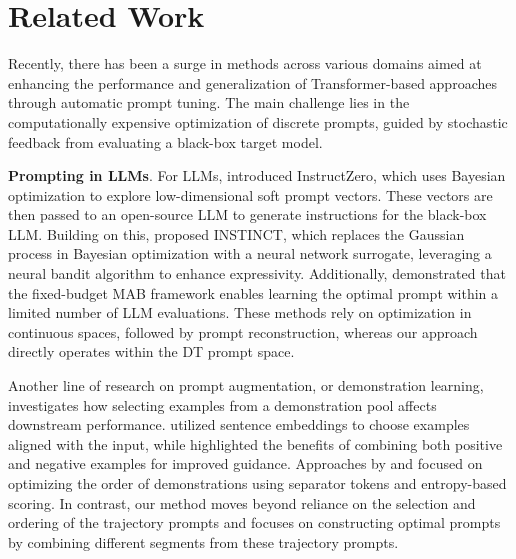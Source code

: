 \documentclass{article} %
\begin{document}

\section{Related Work}
\label{sec:related_work}
Recently, there has been a surge in methods across various domains aimed at enhancing the performance and generalization of Transformer-based approaches through automatic prompt tuning. The main challenge lies in the computationally expensive optimization of discrete prompts, guided by stochastic feedback from evaluating a black-box target model.

\textbf{Prompting in LLMs}. For LLMs, \citet{pmlr-v235-chen24e} introduced {I}nstruct{Z}ero, which uses Bayesian optimization to explore low-dimensional soft prompt vectors. These vectors are then passed to an open-source LLM to generate instructions for the black-box LLM. Building on this, \citet{lin2023use} proposed INSTINCT, which replaces the Gaussian process in Bayesian optimization with a neural network surrogate, leveraging a neural bandit algorithm to enhance expressivity. Additionally, \citet{shi2024best} demonstrated that the fixed-budget MAB framework enables learning the optimal prompt within a limited number of LLM evaluations. These methods rely on optimization in continuous spaces, followed by prompt reconstruction, whereas our approach directly operates within the DT prompt space.

Another line of research on prompt augmentation, or demonstration learning, investigates how selecting examples from a demonstration pool affects downstream performance. \citet{liu2021makes} utilized sentence embeddings to choose examples aligned with the input, while \citet{mishra2021natural} highlighted the benefits of combining both positive and negative examples for improved guidance. Approaches by \citet{kumar2021reordering} and \citet{lu2021fantastically} focused on optimizing the order of demonstrations using separator tokens and entropy-based scoring. In contrast, our method moves beyond reliance on the selection and ordering of the trajectory prompts and focuses on constructing optimal prompts by combining different segments from these trajectory prompts.
\end{document}
